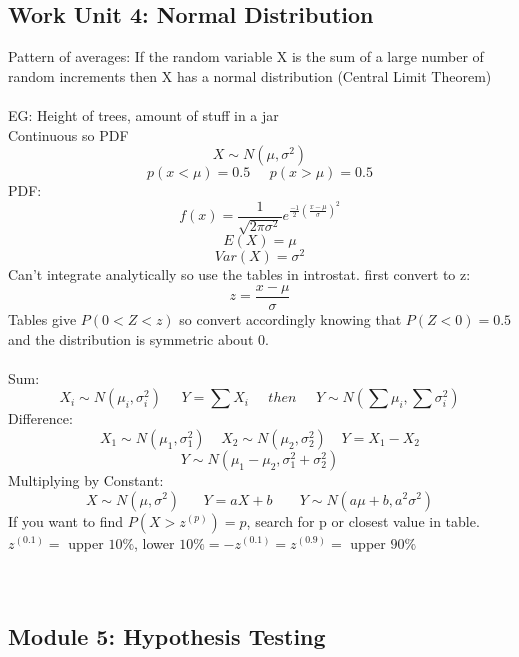 \documentclass[a4paper,10pt]{article}
\begin{document}
\subsection{Work Unit 4: Normal Distribution}
Pattern of averages: If the random variable X is the sum of a large number of random increments then X has a normal distribution (Central Limit Theorem)\\
\\ EG: Height of trees, amount of stuff in a jar
\\ Continuous so PDF \\
\[
	X \sim N(\mu, \sigma^2)
\]
\[
	p(x<\mu) = 0.5 \;\;\;\;\; p(x>\mu) = 0.5
\]
PDF:
\[
	f(x) = \frac{1}{\sqrt{2\pi\sigma^2}}e^{\frac{-1}{2}(\frac{x-\mu}{\sigma})^2}
\]
\[
	E(X) = \mu
\]
\[
	Var(X) = \sigma^2
\]
Can't integrate analytically so use the tables in introstat.
first convert to z:
\[
	z = \frac{x-\mu}{\sigma}
\]
Tables give $P(0<Z<z)$ so convert accordingly knowing that $P(Z<0) = 0.5$ and the distribution is symmetric about 0.\\\\
Sum:
\[
	X_i \sim N(\mu_i, \sigma_i^2) \;\;\;\;\; Y = \sum X_i \;\;\;\;\; then \;\;\;\;\; Y\sim N(\sum \mu_i, \sum \sigma_i^2)
\]
Difference:
\[
	X_1 \sim N(\mu_1, \sigma_1^2) \;\;\;\; X_2 \sim N(\mu_2, \sigma_2^2)\;\;\;\ Y = X_1 -X_2
\]
\[
	Y \sim N(\mu_1-\mu_2, \sigma_1^2+\sigma_2^2)
\]
Multiplying by Constant:
\[
	X \sim N(\mu, \sigma^2) \;\;\;\;\;\; Y = aX+b \;\;\;\;\;\;\; Y\sim N(a\mu+b, a^2\sigma^2)
\]
If you want to find $P(X>z^{(p)}) = p$, search for p or closest value in table. $z^{(0.1)} = $ upper $10\%$, lower $10\% = -z^{(0.1)} = z^{(0.9)} = $ upper $90\%$ \\\\\\
\subsection{Module 5: Hypothesis Testing}
\end{document}
